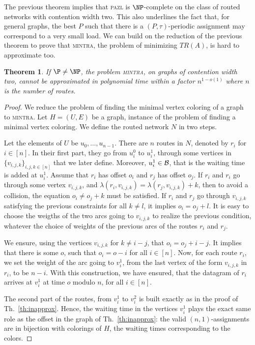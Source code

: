 \documentclass[a4paper,10pt]{article}
\newtheorem{theorem}{Theorem}
\newcommand\pazl{\textsc{pazl}\xspace}
\newcommand\mintra{\textsc{mintra}\xspace}
\begin{document}
The previous theorem implies that \pazl is $\NP$-complete on the class of routed networks with contention width two. This also underlines the fact that, for general graphs, the best $P$ such that there is a 
$(P,\tau)$-periodic assignment may correspond to a very small load. We can build on the reduction of the previous theorem to prove that \mintra, the problem of minimizing $TR(A)$, is hard to approximate too.

\begin{theorem}
If $\P \neq \NP$, the problem \mintra, on graphs of contention width two, cannot be approximated in polynomial time within a factor $n^{1-o(1)}$ where $n$ is the number of routes.
\end{theorem}

\begin{proof}
We reduce the problem of finding the minimal vertex coloring of a graph to \mintra.
 Let $H = (U,E)$ be a graph, instance of the problem of finding a minimal vertex coloring. 
 We define the routed network $N$ in two steps. 

 Let the elements of $U$ be $u_0,\dots, u_{n-1}$. There are $n$ routes in $N$, denoted by $r_i$ for $i \in [n]$. In their first part, they go from $u_i^0$ to $u_i^1$, through some vertices in $\{v_{i,j,k}\}_{i,j,k \in [n]}$ that we later define. Moreover, $u_i^1 \in \cal{B}$, that is the waiting time is added at $u_i^1$. Assume that $r_i$ has offset $o_i$ and $r_j$ has offset $o_j$.
 If $r_i$ and $r_i$ go through some vertex $v_{i,j,k}$, and  $\lambda(r_i,v_{i,j,k}) = \lambda(r_j,v_{i,j,k}) + k$, then to avoid a collision, the equation $o_i \neq o_j + k$ must be satisfied. If $r_i$ and $r_j$ go through $v_{i,j,k}$ satisfying the previous constraints for all $k \neq l$, it implies $o_i = o_j + l$. 
 It is easy to choose the weigths of the two arcs going to $v_{i,j,k}$ to realize the previous condition, whatever the choice of weights of the previous arcs of the routes $r_i$ and $r_j$.

We ensure, using the vertices $v_{i,j,k}$ for $k \neq i-j$,
that $o_{i} = o_{j} + i - j$. It implies that there is some $o$, such that 
$o_{i} = o - i$ for all $i \in [n]$. Now, for each route $r_i$, we set the weight of the
arc going to $v_i^1$, from the last vertex of the form $v_{i,j,k}$ in $r_i$, to be $n-i$.
With this construction, we have ensured, that the datagram of $r_i$ arrives at 
$v_i^1$ at time $o$ modulo $n$, for all $i \in [n]$. 

The second part of the routes, from $v_i^1$ to $v_i^2$ is built exactly as in the proof of Th.~\ref{th:inapprox}. Hence, the waiting time in the vertices $v_i^1$ plays the exact same role as the offset
in the graph of Th.~\ref{th:inapprox}: the valid $(n,1)$-assignments are in bijection with colorings of $H$, the waiting times corresponding to the colors.


\end{proof}
\end{document}
